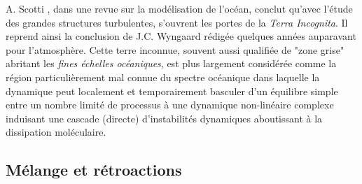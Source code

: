 A. Scotti \citep{scotti_large_2010}, dans une revue sur la modélisation de l'océan, conclut qu’avec l'étude des grandes structures turbulentes, s'ouvrent les portes de la \textit{Terra Incognita}. Il reprend ainsi la conclusion de J.C. Wyngaard \citep{wyngaard_toward_2004} rédigée quelques années auparavant pour l'atmosphère. Cette terre inconnue, souvent aussi qualifiée de "zone grise" abritant les \textit{fines échelles océaniques}, est plus largement considérée comme la région particulièrement mal connue du spectre océanique dans laquelle la dynamique peut localement et temporairement basculer d'un équilibre simple entre un nombre limité de processus à une dynamique non-linéaire complexe induisant une cascade (directe) d'instabilités dynamiques aboutissant à la dissipation moléculaire. 
\color{black}
\subsection{Mélange et rétroactions}
\label{subsection_retroactions}

